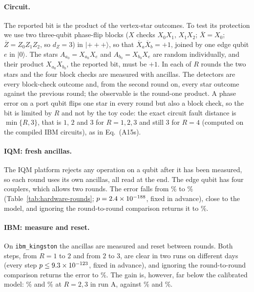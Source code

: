 \documentclass[aps,prx,reprint,superscriptaddress,nofootinbib,floatfix,longbibliography]{revtex4-2}
\theoremstyle{definition}
\begin{document}
\paragraph{Circuit.}
The reported bit is the product of the vertex-star outcomes.  To test its
protection we use two three-qubit phase-flip blocks ($X$ checks $X_0X_1$,
$X_1X_2$; $\overline X=X_0$; $\overline Z=Z_0Z_1Z_2$, so $d_Z=3$) in
$|{+}{+}{+}\rangle$, so that $\overline X_a\overline X_b=+1$, joined by one
edge qubit $e$ in $|0\rangle$.  The stars $A_{a_0}=X_{a_0}X_e$ and
$A_{b_0}=X_{b_0}X_e$ are random individually, and their product
$X_{a_0}X_{b_0}$, the reported bit, must be $+1$.  In each of $R$ rounds the
two stars and the four block checks are measured with ancillas.  The
detectors are every block-check outcome and, from the second round on, every
star outcome against the previous round; the observable is the round-one
product.  A phase error on a port qubit flips one star in every round but
also a block check, so the bit is limited by $R$ and not by the toy code: the
exact circuit fault distance is $\min\{R,3\}$, that is $1$, $2$ and $3$ for
$R=1,2,3$ and still $3$ for $R=4$ (computed on the compiled IBM circuits), as
in Eq.~(A15s).

\paragraph{IQM: fresh ancillas.}
The IQM platform rejects any operation on a qubit after it has been measured,
so each round uses its own ancillas, all read at the end.  The edge qubit has
four couplers, which allows two rounds.  The error falls from \hwRndIQMOne\%
to \hwRndIQMTwo\% (Table~\ref{tab:hardware-rounds}; $p=2.4\times10^{-188}$, fixed in
advance), close to the model, and ignoring the round-to-round comparison
returns it to \hwRndIQMctrl\%.

\paragraph{IBM: measure and reset.}
On \texttt{ibm\_kingston} the ancillas are measured and reset between rounds.
Both steps, from $R=1$ to $2$ and from $2$ to $3$, are clear in two runs on
different days (every step $p\le9.3\times10^{-123}$, fixed in advance), and
ignoring the round-to-round comparison returns the error to \hwRndIBMctrl\%.
The gain is, however, far below the calibrated model: \hwRndIBMTwo\% and
\hwRndIBMThree\% at $R=2,3$ in run A, against \hwRndIBMModelTwo\% and
\hwRndIBMModelThree\%.
\end{document}
